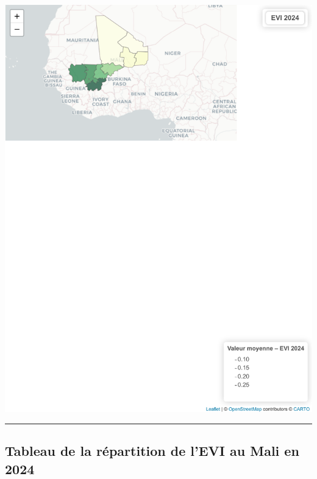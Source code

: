 \documentclass[
]{book}
\begin{document}
\includegraphics{Atlas-Spectral-Sahel_files/figure-latex/vegetation-evi-1.pdf}

\begin{center}\rule{0.5\linewidth}{0.5pt}\end{center}

\subsection{Tableau de la répartition de l'EVI au Mali en 2024}\label{tableau-de-la-ruxe9partition-de-levi-au-mali-en-2024}
\end{document}
